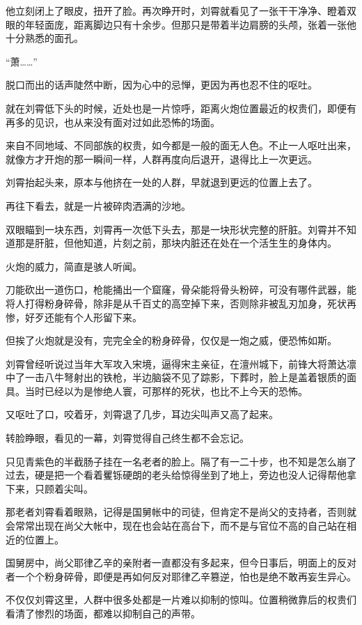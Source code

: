 他立刻闭上了眼皮，扭开了脸。再次睁开时，刘霄就看见了一张干干净净、瞪着双眼的年轻面庞，距离脚边只有十余步。但那只是带着半边肩膀的头颅，张着一张他十分熟悉的面孔。

“萧……”

脱口而出的话声陡然中断，因为心中的忌惮，更因为再也忍不住的呕吐。

就在刘霄低下头的时候，近处也是一片惊呼，距离火炮位置最近的权贵们，即便有再多的见识，也从来没有面对过如此恐怖的场面。

来自不同地域、不同部族的权贵，如今都是一般的面无人色。不止一人呕吐出来，就像方才开炮的那一瞬间一样，人群再度向后退开，退得比上一次更远。

刘霄抬起头来，原本与他挤在一处的人群，早就退到更远的位置上去了。

再往下看去，就是一片被碎肉洒满的沙地。

双眼瞄到一块东西，刘霄再一次低下头去，那是一块形状完整的肝脏。刘霄并不知道那是肝脏，但他知道，片刻之前，那块内脏还在处在一个活生生的身体内。

火炮的威力，简直是骇人听闻。

刀能砍出一道伤口，枪能捅出一个窟窿，骨朵能将骨头粉碎，可没有哪件武器，能将人打得粉身碎骨，除非是从千百丈的高空掉下来，否则除非被乱刃加身，死状再惨，好歹还能有个人形留下来。

但挨了火炮就是没有，完完全全的粉身碎骨，仅仅是一炮之威，便恐怖如斯。

刘霄曾经听说过当年大军攻入宋境，逼得宋主亲征，在澶州城下，前锋大将萧达凛中了一击八牛弩射出的铁枪，半边脑袋不见了踪影，下葬时，脸上是盖着银质的面具。当时已经以为是惨绝人寰，可那样的死状，也比不上今天的恐怖。

又呕吐了口，咬着牙，刘霄退了几步，耳边尖叫声又高了起来。

转脸睁眼，看见的一幕，刘霄觉得自己终生都不会忘记。

只见青紫色的半截肠子挂在一名老者的脸上。隔了有一二十步，也不知是怎么崩了过去，硬是把一个看着矍铄硬朗的老头给惊得坐到了地上，旁边也没人记得帮他拿下来，只顾着尖叫。

那老者刘霄看着眼熟，记得是国舅帐中的司徒，但肯定不是尚父的支持者，否则就会常常出现在尚父大帐中，现在也会站在高台下，而不是与官位不高的自己站在相近的位置上。

国舅房中，尚父耶律乙辛的亲附者一直都没有多起来，但今日事后，明面上的反对者一个个粉身碎骨，即便是再如何反对耶律乙辛篡逆，怕也是绝不敢再妄生异心。

不仅仅刘霄这里，人群中很多处都是一片难以抑制的惊叫。位置稍微靠后的权贵们看清了惨烈的场面，都难以抑制自己的声带。

